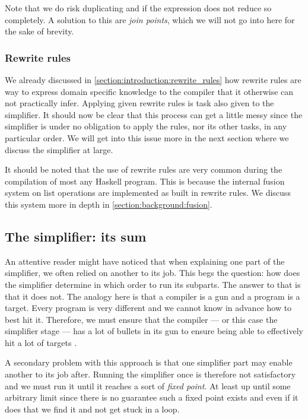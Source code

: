 Note that we do risk duplicating  and  if the expression does not reduce so completely.
A solution to this are \textit{join points}, which we will not go into here for the sake of brevity.

\subsubsection{Rewrite rules}

We already discussed in \cref{section:introduction:rewrite_rules} how rewrite rules are way to express domain
specific knowledge to the compiler that it otherwise can not practically infer. Applying given rewrite rules is task
also given to the simplifier. It should now be clear that this process can get a little messy since the simplifier
is under no obligation to apply the rules, nor its other tasks, in any particular order. We will get into this issue
more in the next section where we discuss the simplifier at large.

It should be noted that the use of rewrite rules are very common during the compilation of most any Haskell program.
This is because the internal fusion system on list operations are implemented as built in rewrite rules.
We discuss this system more in depth in \cref{section:background:fusion}.



\subsection{The simplifier: its sum}

An attentive reader might have noticed that when explaining one part of the simplifier, we often relied on another to
its job. This begs the question: how does the simplifier determine in which order to run its subparts. The answer to that is
that it does not. The analogy here is that a compiler is a gun and a program is a target. Every program is very different
and we cannot know in advance how to best hit it. Therefore, we must ensure that the compiler --- or this case the simplifier stage ---
has a lot of bullets in its gun to ensure being able to effectively hit a lot of targets \cite{haskell_optimisations_1997}.

A secondary problem with this approach is that one simplifier part may enable another to its job after. Running the simplifier
once is therefore not satisfactory and we must run it until it reaches a sort of \textit{fixed point}. At least up until some
arbitrary limit since there is no guarantee such a fixed point exists and even if it does that we find it and not get stuck in a loop.

